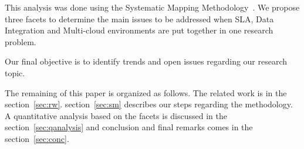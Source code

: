 This analysis was done using the Systematic Mapping Methodology~\cite{SM:Petersen:2008}. We propose three facets to determine the main issues to be addressed when SLA, Data Integration and Multi-cloud environments are put together in one research problem.



Our final objective is to identify trends and open issues regarding our research topic.

The remaining of this paper is organized as follows. 
The related work is in the section~\ref{sec:rw}. 
section~\ref{sec:sm} describes our steps regarding the methodology.
A quantitative analysis based on the facets is discussed in the section~\ref{sec:qanalysis} and conclusion and final
remarks comes in the section~\ref{sec:conc}. 